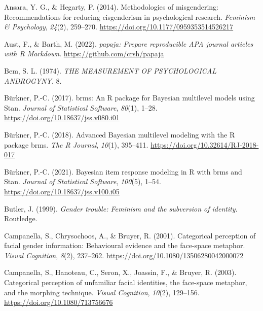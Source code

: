 \documentclass[
  man,
  longtable,
  nolmodern,
  notxfonts,
  notimes,
  colorlinks=true,linkcolor=blue,citecolor=blue,urlcolor=blue]{apa7}
\newlength{\cslhangindent}
\newenvironment{CSLReferences}[2] %
 {\begin{list}{}{%
  \setlength{\itemindent}{0pt}
  \setlength{\leftmargin}{0pt}
  \setlength{\parsep}{0pt}
  \ifodd #1
   \setlength{\leftmargin}{\cslhangindent}
   \setlength{\itemindent}{-1\cslhangindent}
  \fi
  \setlength{\itemsep}{#2\baselineskip}}}
 {\end{list}}
\begin{document}
\label{refs}
\begin{CSLReferences}{1}{0}
Ansara, Y. G., \& Hegarty, P. (2014). Methodologies of misgendering:
{Recommendations} for reducing cisgenderism in psychological research.
\emph{Feminism \& Psychology}, \emph{24}(2), 259--270.
\url{https://doi.org/10.1177/0959353514526217}

Aust, F., \& Barth, M. (2022). \emph{{papaja}: {Prepare} reproducible
{APA} journal articles with {R Markdown}}.
\url{https://github.com/crsh/papaja}

Bem, S. L. (1974). \emph{{THE MEASUREMENT OF PSYCHOLOGICAL ANDROGYNY}}.
8.

Bürkner, P.-C. (2017). {brms}: An {R} package for {Bayesian} multilevel
models using {Stan}. \emph{Journal of Statistical Software},
\emph{80}(1), 1--28. \url{https://doi.org/10.18637/jss.v080.i01}

Bürkner, P.-C. (2018). Advanced {Bayesian} multilevel modeling with the
{R} package {brms}. \emph{The R Journal}, \emph{10}(1), 395--411.
\url{https://doi.org/10.32614/RJ-2018-017}

Bürkner, P.-C. (2021). Bayesian item response modeling in {R} with
{brms} and {Stan}. \emph{Journal of Statistical Software},
\emph{100}(5), 1--54. \url{https://doi.org/10.18637/jss.v100.i05}

Butler, J. (1999). \emph{Gender trouble: Feminism and the subversion of
identity}. {Routledge}.

Campanella, S., Chrysochoos, A., \& Bruyer, R. (2001). Categorical
perception of facial gender information: {Behavioural} evidence and the
face-space metaphor. \emph{Visual Cognition}, \emph{8}(2), 237--262.
\url{https://doi.org/10.1080/13506280042000072}

Campanella, S., Hanoteau, C., Seron, X., Joassin, F., \& Bruyer, R.
(2003). Categorical perception of unfamiliar facial identities, the
face-space metaphor, and the morphing technique. \emph{Visual
Cognition}, \emph{10}(2), 129--156.
\url{https://doi.org/10.1080/713756676}


\end{CSLReferences}
\end{document}
